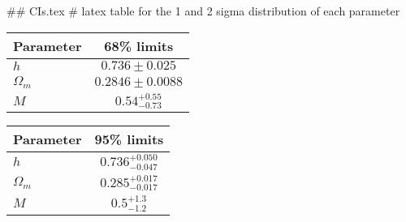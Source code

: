## CIs.tex
# latex table for the 1 and 2 sigma distribution of each parameter

\begin{tabular} { l  c}
 Parameter &  68\% limits\\
\hline
{\boldmath$h              $} & $0.736\pm 0.025            $\\
{\boldmath$\Omega_m       $} & $0.2846\pm 0.0088          $\\
{\boldmath$M              $} & $0.54^{+0.55}_{-0.73}      $\\
\hline
\end{tabular}

\begin{tabular} { l  c}
 Parameter &  95\% limits\\
\hline
{\boldmath$h              $} & $0.736^{+0.050}_{-0.047}   $\\
{\boldmath$\Omega_m       $} & $0.285^{+0.017}_{-0.017}   $\\
{\boldmath$M              $} & $0.5^{+1.3}_{-1.2}         $\\
\hline
\end{tabular}
